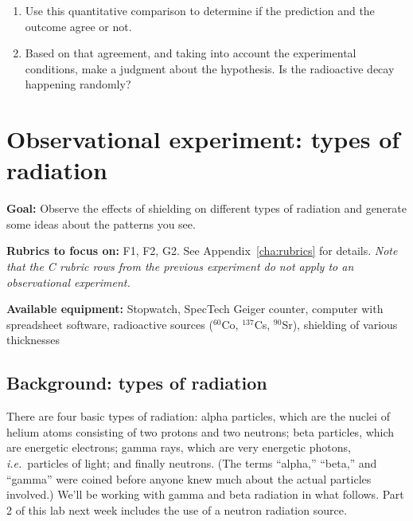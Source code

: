 \begin{enumerate}
	
	\item Use this quantitative comparison to determine if the prediction and the outcome agree or not.
	
	\item Based on that agreement, and taking into account the experimental conditions, make a judgment about the hypothesis. Is the radioactive decay happening randomly?
\end{enumerate}

\section{Observational experiment: types of radiation}

\textbf{Goal:} Observe the effects of shielding on different types of radiation and generate some ideas about the patterns you see.

\textbf{Rubrics to focus on:} F1, F2, G2. See Appendix~\ref{cha:rubrics} for details. \textit{Note that the C rubric rows from the previous experiment do not apply to an observational experiment.}

\textbf{Available equipment:} Stopwatch, SpecTech Geiger counter, computer with spreadsheet software, radioactive sources ($^{60}$Co, $^{137}$Cs, $^{90}$Sr), shielding of various thicknesses

\subsection{Background: types of radiation}

There are four basic types of radiation: alpha particles, which are the nuclei of helium
atoms consisting of two protons and two neutrons; beta particles, which are energetic
electrons; gamma rays, which are very energetic photons, \textit{i.e.}\ particles of light; and
finally neutrons. (The terms ``alpha,'' ``beta,'' and ``gamma'' were coined before anyone
knew much about the actual particles involved.) We’ll be working with gamma and beta
radiation in what follows. Part 2 of this lab next week includes the use of a neutron
radiation source.

